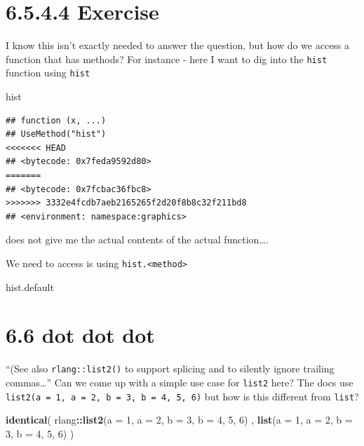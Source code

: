 \documentclass[]{book}
\newenvironment{Shaded}{\begin{snugshade}}{\end{snugshade}}
\newcommand{\DataTypeTok}[1]{\textcolor[rgb]{0.13,0.29,0.53}{#1}}
\newcommand{\DecValTok}[1]{\textcolor[rgb]{0.00,0.00,0.81}{#1}}
\newcommand{\KeywordTok}[1]{\textcolor[rgb]{0.13,0.29,0.53}{\textbf{#1}}}
\newcommand{\NormalTok}[1]{#1}
\newcommand{\OperatorTok}[1]{\textcolor[rgb]{0.81,0.36,0.00}{\textbf{#1}}}
\begin{document}
\hypertarget{exercise-3}{%
\section*{6.5.4.4 Exercise}\label{exercise-3}}

I know this isn't exactly needed to answer the question, but how do we access a function that has methods? For instance - here I want to dig into the \texttt{hist} function using \texttt{hist}

\begin{Shaded}
\begin{Highlighting}[]
\NormalTok{hist}
\end{Highlighting}
\end{Shaded}

\begin{verbatim}
## function (x, ...) 
## UseMethod("hist")
<<<<<<< HEAD
## <bytecode: 0x7feda9592d80>
=======
## <bytecode: 0x7fcbac36fbc8>
>>>>>>> 3332e4fcdb7aeb2165265f2d20f8b8c32f211bd8
## <environment: namespace:graphics>
\end{verbatim}

does not give me the actual contents of the actual function\ldots{}.

We need to access is using \texttt{hist.\textless{}method\textgreater{}}

\begin{Shaded}
\begin{Highlighting}[]
\NormalTok{hist.default}
\end{Highlighting}
\end{Shaded}

\hypertarget{dot-dot-dot}{%
\section*{6.6 dot dot dot}\label{dot-dot-dot}}

``(See also \texttt{rlang::list2()} to support splicing and to silently ignore trailing commas\ldots{}'' Can we come up with a simple use case for \texttt{list2} here? The docs use \texttt{list2(a\ =\ 1,\ a\ =\ 2,\ b\ =\ 3,\ b\ =\ 4,\ 5,\ 6)} but how is this different from \texttt{list}?

\begin{Shaded}
\begin{Highlighting}[]
\KeywordTok{identical}\NormalTok{(}
\NormalTok{  rlang}\OperatorTok{::}\KeywordTok{list2}\NormalTok{(}\DataTypeTok{a =} \DecValTok{1}\NormalTok{, }\DataTypeTok{a =} \DecValTok{2}\NormalTok{, }\DataTypeTok{b =} \DecValTok{3}\NormalTok{, }\DataTypeTok{b =} \DecValTok{4}\NormalTok{, }\DecValTok{5}\NormalTok{, }\DecValTok{6}\NormalTok{) ,}
  \KeywordTok{list}\NormalTok{(}\DataTypeTok{a =} \DecValTok{1}\NormalTok{, }\DataTypeTok{a =} \DecValTok{2}\NormalTok{, }\DataTypeTok{b =} \DecValTok{3}\NormalTok{, }\DataTypeTok{b =} \DecValTok{4}\NormalTok{, }\DecValTok{5}\NormalTok{, }\DecValTok{6}\NormalTok{)}
\NormalTok{)}
\end{Highlighting}
\end{Shaded}
\end{document}
